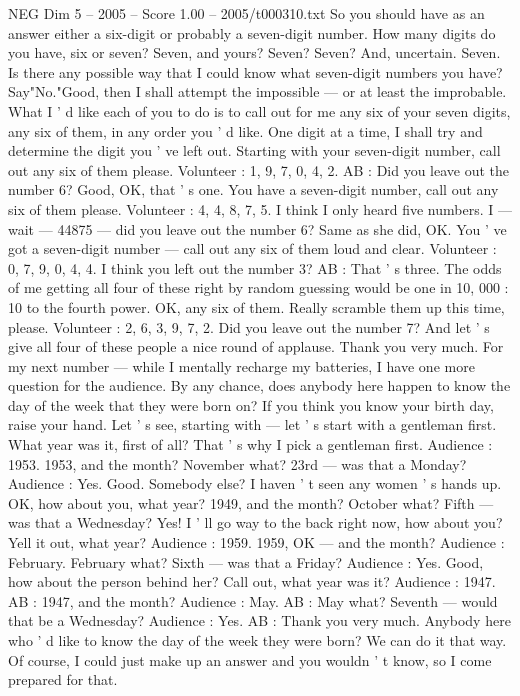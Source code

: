 \begin{textsample}{NEG Dim 5 – 2005 – Score 1.00 – 2005/t000310.txt}
So you should have as an answer either a six-digit or probably a seven-digit number.
How many digits do you have, six or seven?
Seven, and yours?
Seven?
Seven?
And, uncertain.
Seven.
Is there any possible way that I could know what seven-digit numbers you have?
Say"No."Good, then I shall attempt the impossible — or at least the improbable.
What I ' d like each of you to do is to call out for me any six of your seven digits, any six of them, in any order you ' d like.
One digit at a time, I shall try and determine the digit you ' ve left out.
Starting with your seven-digit number, call out any six of them please.
Volunteer : 1, 9, 7, 0, 4, 2.
AB : Did you leave out the number 6?
Good, OK, that ' s one.
You have a seven-digit number, call out any six of them please.
Volunteer : 4, 4, 8, 7, 5.
I think I only heard five numbers.
I — wait — 44875 — did you leave out the number 6?
Same as she did, OK.
You ' ve got a seven-digit number — call out any six of them loud and clear.
Volunteer : 0, 7, 9, 0, 4, 4.
I think you left out the number 3?
AB : That ' s three.
The odds of me getting all four of these right by random guessing would be one in 10, 000 : 10 to the fourth power.
OK, any six of them.
Really scramble them up this time, please.
Volunteer : 2, 6, 3, 9, 7, 2.
Did you leave out the number 7?
And let ' s give all four of these people a nice round of applause.
Thank you very much.
For my next number — while I mentally recharge my batteries, I have one more question for the audience.
By any chance, does anybody here happen to know the day of the week that they were born on?
If you think you know your birth day, raise your hand.
Let ' s see, starting with — let ' s start with a gentleman first.
What year was it, first of all?
That ' s why I pick a gentleman first.
Audience : 1953. 1953, and the month?
November what? 23rd — was that a Monday?
Audience : Yes.
Good.
Somebody else?
I haven ' t seen any women ' s hands up.
OK, how about you, what year? 1949, and the month?
October what?
Fifth — was that a Wednesday?
Yes!
I ' ll go way to the back right now, how about you?
Yell it out, what year?
Audience : 1959. 1959, OK — and the month?
Audience : February.
February what?
Sixth — was that a Friday?
Audience : Yes.
Good, how about the person behind her?
Call out, what year was it?
Audience : 1947.
AB : 1947, and the month?
Audience : May.
AB : May what?
Seventh — would that be a Wednesday?
Audience : Yes.
AB : Thank you very much.
Anybody here who ' d like to know the day of the week they were born?
We can do it that way.
Of course, I could just make up an answer and you wouldn ' t know, so I come prepared for that.

\end{textsample}
